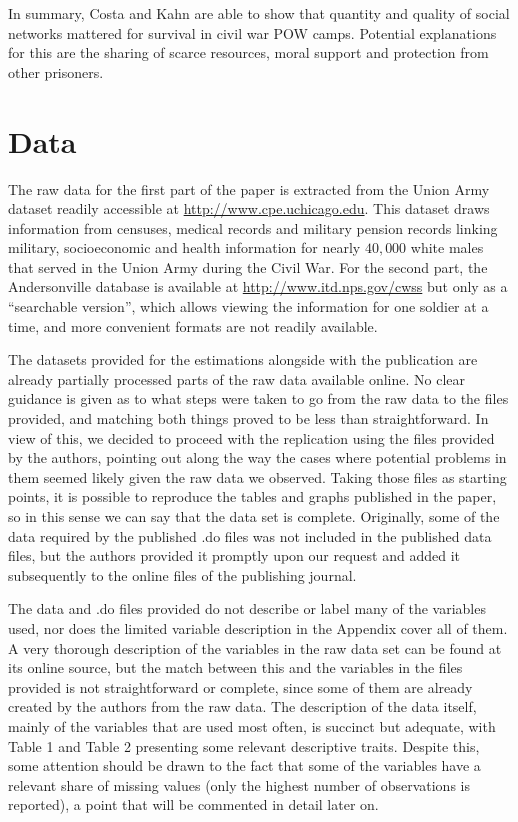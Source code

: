 \documentclass[a4paper]{report}\usepackage{graphicx, color}
\begin{document}
\begin{refsection}
In summary, Costa and Kahn are able to show that quantity and quality of social networks mattered for survival in civil war POW camps. Potential explanations for this are the sharing of scarce resources, moral support and protection from other prisoners.

\section{Data}
The raw data for the first part of the paper is extracted from the Union Army dataset readily accessible at \url{http://www.cpe.uchicago.edu}. This dataset draws information from censuses, medical records and military pension records linking military, socioeconomic and health information for nearly $40,000$ white males that served in the Union Army during the Civil War. For the second part, the Andersonville database is available at \url{http://www.itd.nps.gov/cwss} but only as a ``searchable version'', which allows viewing the information for one soldier at a time, and more convenient formats are not readily available.

The datasets provided for the estimations alongside with the publication are already partially processed parts of the raw data available online. No clear guidance is given as to what steps were taken to go from the raw data to the files provided, and matching both things proved to be less than straightforward. In view of this, we decided to proceed with the replication using the files provided by the authors, pointing out along the way the cases where potential problems in them seemed likely given the raw data we observed. Taking those files as starting points, it is possible to reproduce the tables and graphs published in the paper, so in this sense we can say that the data set is complete. Originally, some of the data required by the published .do files was not included in the published data files, but the authors provided it promptly upon our request and added it subsequently to the online files of the publishing journal.

The data and .do files provided do not describe or label many of the variables used, nor does the limited variable description in the Appendix cover all of them. A very thorough description of the variables in the raw data set can be found at its online source, but the match between this and the variables in the files provided is not straightforward or complete, since some of them are already created by the authors from the raw data. The description of the data itself, mainly of the variables that are used most often, is succinct but adequate, with Table 1 and Table 2 presenting some relevant descriptive traits. Despite this, some attention should be drawn to the fact that some of the variables have a relevant share of missing values (only the highest number of observations is reported), a point that will be commented in detail later on.


\end{refsection}
\end{document}
